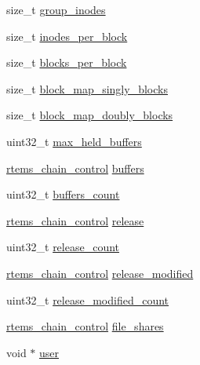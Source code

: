 \begin{DoxyCompactItemize}
\item 
size\+\_\+t \mbox{\hyperlink{struct__rtems__rfs__file__system_ae07dd663de903c5bf808348a1a103b96}{group\+\_\+inodes}}
\item 
size\+\_\+t \mbox{\hyperlink{struct__rtems__rfs__file__system_a2238640dc608430af388f945388d8d83}{inodes\+\_\+per\+\_\+block}}
\item 
size\+\_\+t \mbox{\hyperlink{struct__rtems__rfs__file__system_a34201873b96a92c26ae78a1becfb0dcb}{blocks\+\_\+per\+\_\+block}}
\item 
size\+\_\+t \mbox{\hyperlink{struct__rtems__rfs__file__system_a4b071ec03b18f32a95b4c12efd8a1567}{block\+\_\+map\+\_\+singly\+\_\+blocks}}
\item 
size\+\_\+t \mbox{\hyperlink{struct__rtems__rfs__file__system_a3a1c5beceac06ccca468cda05645bdd9}{block\+\_\+map\+\_\+doubly\+\_\+blocks}}
\item 
uint32\+\_\+t \mbox{\hyperlink{struct__rtems__rfs__file__system_a574d11a2524d4e18dc8bd1d82d92dbfb}{max\+\_\+held\+\_\+buffers}}
\item 
\mbox{\hyperlink{unionChain__Control}{rtems\+\_\+chain\+\_\+control}} \mbox{\hyperlink{struct__rtems__rfs__file__system_afd5099411334a6c40098d0ae9c99244a}{buffers}}
\item 
uint32\+\_\+t \mbox{\hyperlink{struct__rtems__rfs__file__system_a2af5fbfc3e9105cb3c0863fdaddbe3f5}{buffers\+\_\+count}}
\item 
\mbox{\hyperlink{unionChain__Control}{rtems\+\_\+chain\+\_\+control}} \mbox{\hyperlink{struct__rtems__rfs__file__system_a2310ba69526d411d3a2ed6090c030076}{release}}
\item 
uint32\+\_\+t \mbox{\hyperlink{struct__rtems__rfs__file__system_a188f677ec5e96bd6aedfd68dc5b44426}{release\+\_\+count}}
\item 
\mbox{\hyperlink{unionChain__Control}{rtems\+\_\+chain\+\_\+control}} \mbox{\hyperlink{struct__rtems__rfs__file__system_ad7115fcdfc240d1db6876011b38d4c0d}{release\+\_\+modified}}
\item 
uint32\+\_\+t \mbox{\hyperlink{struct__rtems__rfs__file__system_a1d36638b20df05929dadec7ced0ef2e5}{release\+\_\+modified\+\_\+count}}
\item 
\mbox{\hyperlink{unionChain__Control}{rtems\+\_\+chain\+\_\+control}} \mbox{\hyperlink{struct__rtems__rfs__file__system_a1a4c986afc75ae546325b44ae52ec00a}{file\+\_\+shares}}
\item 
void $\ast$ \mbox{\hyperlink{struct__rtems__rfs__file__system_a6364183c17498523181c336b38c28b91}{user}}
\end{DoxyCompactItemize}


